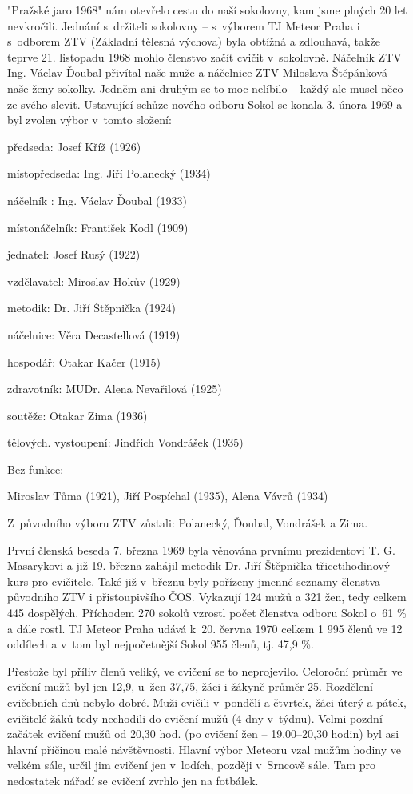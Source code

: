 \documentclass[a5paper, 11pt, twoside]{article}
\begin{document}
"Pražské jaro 1968" nám otevřelo cestu do naší sokolovny, kam jsme
plných 20 let nevkročili. Jednání s~držiteli sokolovny -- s~výborem TJ
Meteor Praha i s~odborem ZTV (Základní tělesná výchova) byla obtížná a
zdlouhavá, takže teprve 21. listopadu 1968 mohlo členstvo začít cvičit
v~sokolovně. Náčelník ZTV Ing. Václav Ďoubal přivítal naše muže a
náčelnice ZTV Miloslava Štěpánková naše ženy-sokolky. Jedněm ani druhým
se to moc nelíbilo -- každý ale musel něco ze svého slevit. Ustavující
schůze nového odboru Sokol se konala 3. února 1969 a byl zvolen výbor
v~tomto složení:

předseda: Josef Kříž (1926)

místopředseda: Ing. Jiří Polanecký (1934)

náčelník : Ing. Václav Ďoubal (1933)

místonáčelník: František Kodl (1909)

jednatel: Josef Rusý (1922)

vzdělavatel: Miroslav Hokův (1929)

metodik: Dr. Jiří Štěpnička (1924)

náčelnice: Věra Decastellová (1919)

hospodář: Otakar Kačer (1915)

zdravotník: MUDr. Alena Nevařilová (1925)

soutěže: Otakar Zima (1936)

tělových. vystoupení: Jindřich Vondrášek (1935)

Bez funkce:

Miroslav Tůma (1921), Jiří Pospíchal (1935), Alena Vávrů (1934)

Z~původního výboru ZTV zůstali: Polanecký, Ďoubal, Vondrášek a Zima.

První členská beseda 7. března 1969 byla věnována prvnímu prezidentovi
T. G. Masarykovi a již 19. března zahájil metodik Dr. Jiří Štěpnička
třicetihodinový kurs pro cvičitele. Také již v~březnu byly pořízeny
jmenné seznamy členstva původního ZTV i přistoupivšího ČOS. Vykazují 124
mužů a 321 žen, tedy celkem 445 dospělých. Příchodem 270 sokolů vzrostl
počet členstva odboru Sokol o~61 \% a dále rostl. TJ Meteor Praha udává
k~20. června 1970 celkem 1 995 členů ve 12 oddílech a v~tom byl
nejpočetnější Sokol 955 členů, tj. 47,9 \%.

Přestože byl příliv členů veliký, ve cvičení se to neprojevilo.
Celoroční průměr ve cvičení mužů byl jen 12,9, u~žen 37,75, žáci i
žákyně průměr 25. Rozdělení cvičebních dnů nebylo dobré. Muži cvičili
v~pondělí a čtvrtek, žáci úterý a pátek, cvičitelé žáků tedy nechodili do
cvičení mužů (4 dny v~týdnu). Velmi pozdní začátek cvičení mužů od 20,30
hod. (po cvičení žen --⁠⁠⁠⁠⁠⁠ 19,00--⁠⁠⁠⁠⁠⁠20,30 hodin) byl asi hlavní příčinou malé
návštěvnosti. Hlavní výbor Meteoru vzal mužům hodiny ve velkém sále,
určil jim cvičení jen v~lodích, později v~Srncově sále. Tam pro
nedostatek nářadí se cvičení zvrhlo jen na fotbálek.
\end{document}
